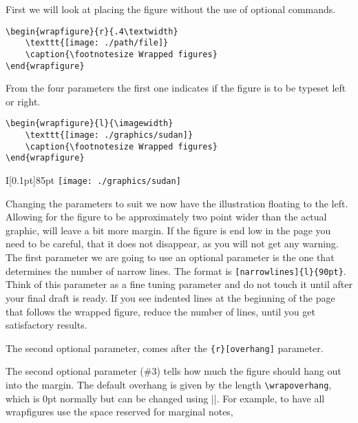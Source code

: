 First we will look at placing the figure without the use of optional commands.


\begin{verbatim}
\begin{wrapfigure}{r}{.4\textwidth}
    \texttt{[image: ./path/file]}
    \caption{\footnotesize Wrapped figures}
\end{wrapfigure}
\end{verbatim}

From the four parameters the first one indicates if the figure is to be typeset left or right.

\begin{verbatim}
\begin{wrapfigure}{l}{\imagewidth}
    \texttt{[image: ./graphics/sudan]}
    \caption{\footnotesize Wrapped figures}
\end{wrapfigure}
\end{verbatim}


\begin{wrapfigure}[16]{I}[0.1pt]{85pt}
    \relax
    \texttt{[image: ./graphics/sudan]}
    \caption{\scriptsize Wrapped figures, parameters set at \texttt\{l\}\{90pt\}.}
\end{wrapfigure}

Changing the parameters to suit we now have the illustration floating to the left. Allowing for the figure to be approximately two point  wider than the actual graphic, will leave a bit more margin. If the figure is end low in the page you need to be careful, that it does not disappear, as you will not get any warning.
The first parameter we are going to use an optional parameter is the one that determines the number of narrow lines. The format is \verb+[narrowlines]{l}{90pt}+. Think of this parameter as a fine tuning parameter and do not touch it until after your final draft is ready. If you see indented lines at the beginning of the page that follows the wrapped figure, reduce the number of lines, until you get satisfactory results.

The second optional parameter, comes after the \texttt{\{r\}[overhang]} parameter.

The second optional parameter (\#3) tells how much the figure should hang out into
the margin. The default overhang is given by the length \verb+\wrapoverhang+, which is 0pt
normally but can be changed using |\setlength|. For example, to have all wrapfigures
use the space reserved for marginal notes,

